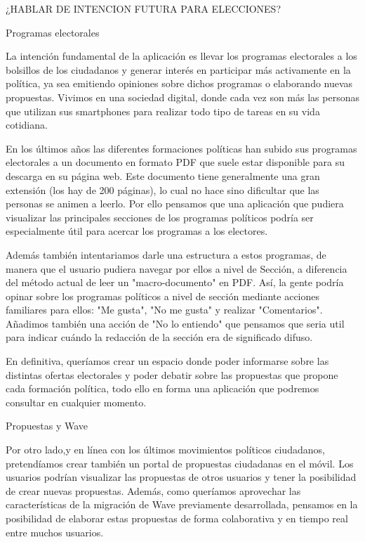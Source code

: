 ¿HABLAR DE INTENCION FUTURA PARA ELECCIONES?

Programas electorales

La intención fundamental de la aplicación es llevar los programas electorales a los bolsillos de los ciudadanos y generar interés en participar más activamente en la política, ya sea emitiendo opiniones sobre dichos programas o elaborando nuevas propuestas. Vivimos en una sociedad digital, donde cada vez son más las personas que utilizan sus smartphones para realizar todo tipo de tareas en su vida cotidiana.

En los últimos años las diferentes formaciones políticas han subido sus programas electorales a un documento en formato PDF que suele estar disponible para su descarga en su página web. Este documento tiene generalmente una gran extensión (los hay de 200 páginas), lo cual no hace sino dificultar que las personas se animen a leerlo. Por ello pensamos que una aplicación que pudiera visualizar las principales secciones de los programas políticos podría ser especialmente útil para acercar los programas a los electores.

Además también intentariamos darle una estructura a estos programas, de manera que el usuario pudiera navegar por ellos a nivel de Sección, a diferencia del método actual de leer un "macro-documento" en PDF. Así, la gente podría opinar sobre los programas políticos a nivel de sección mediante acciones familiares para ellos: "Me gusta", "No me gusta" y realizar "Comentarios". Añadimos también una acción de "No lo entiendo" que pensamos que seria util para indicar cuándo la redacción de la sección era de significado difuso.

En definitiva, queríamos crear un espacio donde poder informarse sobre las distintas ofertas electorales y poder debatir sobre las propuestas que propone cada formación política, todo ello en forma una aplicación que podremos consultar en cualquier momento. 

Propuestas y Wave

Por otro lado,y en línea con los últimos movimientos políticos ciudadanos, pretendíamos crear también un portal de propuestas ciudadanas en el móvil. Los usuarios podrían visualizar las propuestas de otros usuarios y tener la posibilidad de crear nuevas propuestas. Además, como queríamos aprovechar las características de la migración de Wave previamente desarrollada, pensamos en la posibilidad de elaborar estas propuestas de forma colaborativa y en tiempo real entre muchos usuarios.


